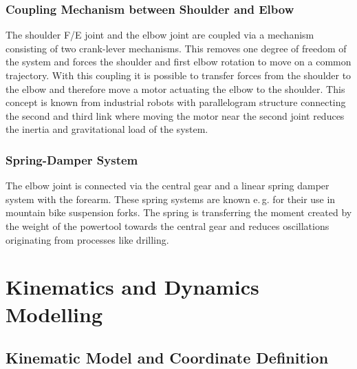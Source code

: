 \documentclass[letterpaper, 10 pt, conference]{ieeeconf}  %
\begin{document}
\subsubsection{Coupling Mechanism between Shoulder and Elbow}

The shoulder F/E joint and the elbow joint are coupled via a mechanism consisting of two crank-lever mechanisms.
This removes one degree of freedom of the system and forces the shoulder and first elbow rotation to move on a common trajectory.
With this coupling it is possible to transfer forces from the shoulder to the elbow and therefore move a motor actuating the elbow to the shoulder.
This concept is known from industrial robots with parallelogram structure connecting the second and third link where moving the motor near the second joint reduces the inertia and gravitational load of the system.\added[id=Lg,remark={Is there a reference for this?}]{}

\subsubsection{Spring-Damper System}

The elbow joint is connected via the central gear and a linear spring damper system with the forearm.
These spring systems are known e.\,g. for their use in mountain bike suspension forks.
The spring is transferring the moment created by the weight of the powertool towards the central gear and reduces oscillations originating from processes like drilling.

\section{Kinematics and Dynamics Modelling}
\label{sec:model}

\subsection{Kinematic Model and Coordinate Definition}
\end{document}

